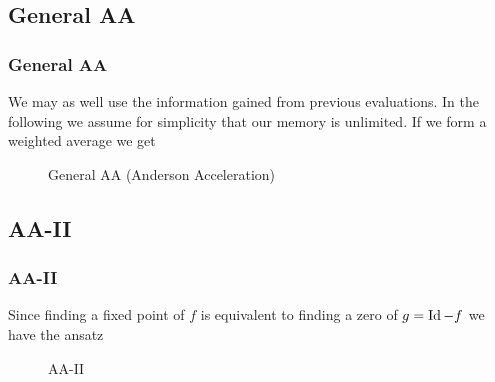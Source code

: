 \subsection{General AA}
\begin{frame}
	\frametitle{General AA}
	We may as well use the information gained from previous evaluations. In the following we assume for simplicity that our memory is unlimited. If we form a weighted average we get
	
	\begin{figure}
	\begin{algorithm}[H]
	\caption{General AA (Anderson Acceleration)}
	\color{gray}
	
	\BlankLine
	\end{algorithm}
	\end{figure}
\end{frame}

\subsection{AA-II}
\begin{frame}
	\frametitle{AA-II}
	Since finding a fixed point of $f$ is equivalent to finding a zero of $g=\operatorname{Id}-f$ we have the ansatz
	
	\begin{figure}
	\begin{algorithm}[H]
	\caption{AA-II}
	\color{gray}
	\BlankLine
	\end{algorithm}
	\end{figure}
\end{frame}


